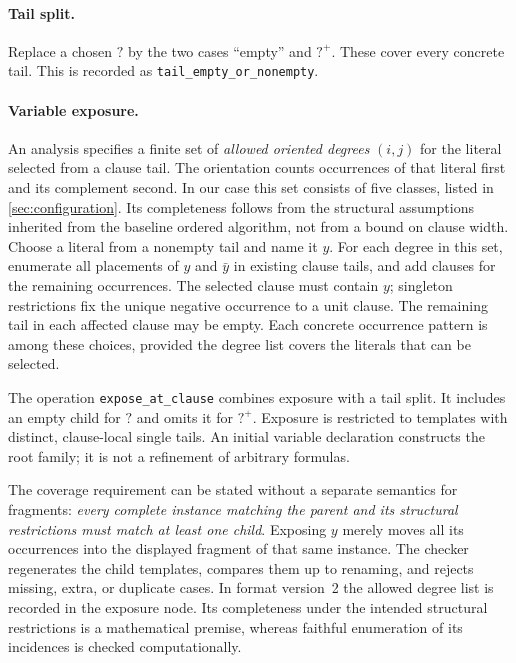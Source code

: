 \documentclass[10pt,twoside]{article}
\newcommand{\anytail}{\mathord{?}}
\newcommand{\plustail}{\mathord{?}^{+}}
\theoremstyle{definition}
\theoremstyle{remark}
\begin{document}
\paragraph{Tail split.}
Replace a chosen $\anytail$ by the two cases ``empty'' and $\plustail$. These cover every
concrete tail. This is recorded as \texttt{tail\_empty\_or\_nonempty}.

\paragraph{Variable exposure.}
An analysis specifies a finite set of \emph{allowed oriented degrees}
$(i,j)$ for the literal selected from a clause tail. The orientation counts
occurrences of that literal first and its complement second. In our case this
set consists of five classes, listed in \cref{sec:configuration}. Its
completeness follows from the structural assumptions inherited from the baseline
ordered algorithm, not from a bound on clause width.
Choose a literal from a nonempty tail and name it $y$. For each degree in
this set, enumerate all placements of $y$ and $\bar y$ in
existing clause tails, and add clauses for the remaining occurrences.
The selected clause must contain $y$; singleton restrictions fix the unique
negative occurrence to a unit clause. The remaining tail in each affected
clause may be empty. Each concrete occurrence pattern is among these choices,
provided the degree list covers the literals that can be selected.

The operation \texttt{expose\_at\_clause} combines exposure with a tail split.
It includes an empty child for $\anytail$ and omits it for $\plustail$. Exposure is restricted to templates with distinct, clause-local
single tails. An initial variable declaration constructs the root family;
it is not a refinement of arbitrary formulas.

The coverage requirement can be stated without a separate semantics for
fragments: \emph{every complete instance matching the parent and its
structural restrictions must match at least one child}. Exposing $y$ merely
moves all its occurrences into the displayed fragment of that same instance.
The checker regenerates the child templates, compares them up to renaming,
and rejects missing, extra, or duplicate cases. In format version~2 the
allowed degree list is recorded in the exposure node. Its completeness under
the intended structural restrictions is a mathematical premise, whereas
faithful enumeration of its incidences is checked computationally.
\end{document}

